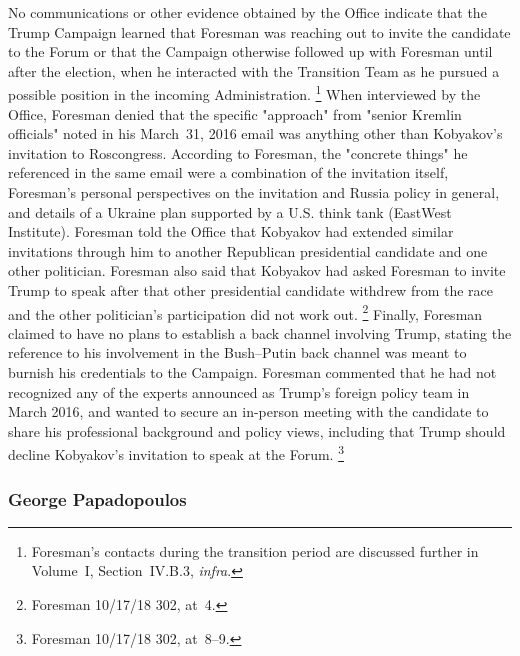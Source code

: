 No communications or other evidence obtained by the Office indicate that the Trump Campaign learned that Foresman was reaching out to invite the candidate to the Forum or that the Campaign otherwise followed up with Foresman until after the election, when he interacted with the Transition Team as he pursued a possible position in the incoming Administration.%
\footnote{Foresman's contacts during the transition period are discussed further in Volume~I, Section~IV.B.3, \textit{infra}.}
When interviewed by the Office, Foresman denied that the specific "approach" from "senior Kremlin officials" noted in his March~31, 2016 email was anything other than Kobyakov's invitation to Roscongress.
According to Foresman, the "concrete things" he referenced in the same email were a combination of the invitation itself, Foresman's personal perspectives on the invitation and Russia policy in general, and details of a Ukraine plan supported by a U.S. think tank (EastWest Institute).
Foresman told the Office that Kobyakov had extended similar invitations through him to another Republican presidential candidate and one other politician.
Foresman also said that Kobyakov had asked Foresman to invite Trump to speak after that other presidential candidate withdrew from the race and the other politician's participation did not work out.%
\footnote{Foresman 10/17/18 302, at~4.}
Finally, Foresman claimed to have no plans to establish a back channel involving Trump, stating the reference to his involvement in the Bush--Putin back channel was meant to burnish his credentials to the Campaign.
Foresman commented that he had not recognized any of the experts announced as Trump's foreign policy team in March 2016, and wanted to secure an in-person meeting with the candidate to share his professional background and policy views, including that Trump should decline Kobyakov's invitation to speak at the Forum.%
\footnote{Foresman 10/17/18 302, at~8--9.}

\subsubsection{George Papadopoulos}

